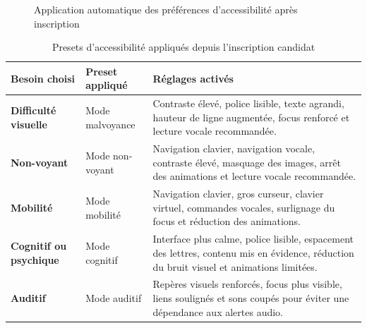 \documentclass[12pt,a4paper]{report}
\newcommand{\tblhead}[1]{\cellcolor{darkblue}\color{white}\bfseries #1}
\newcommand{\tblleft}[1]{\bfseries\color{darkblue} #1}
\begin{document}
\begin{figure}[H]
\centering
{}
\caption{Application automatique des préférences d'accessibilité après inscription}
\label{fig:accessibilite-inscription-preset}
\end{figure}

\renewcommand{\arraystretch}{1.25}
\begin{table}[H]
\centering
\begin{tabularx}{\textwidth}{|L{3.4cm}|Y|Y|}
\hline
\tblhead{Besoin choisi} & \tblhead{Preset appliqué} & \tblhead{Réglages activés} \\
\hline
\tblleft{Difficulté visuelle} & Mode malvoyance & Contraste élevé, police lisible, texte agrandi, hauteur de ligne augmentée, focus renforcé et lecture vocale recommandée. \\
\hline
\tblleft{Non-voyant} & Mode non-voyant & Navigation clavier, navigation vocale, contraste élevé, masquage des images, arrêt des animations et lecture vocale recommandée. \\
\hline
\tblleft{Mobilité} & Mode mobilité & Navigation clavier, gros curseur, clavier virtuel, commandes vocales, surlignage du focus et réduction des animations. \\
\hline
\tblleft{Cognitif ou psychique} & Mode cognitif & Interface plus calme, police lisible, espacement des lettres, contenu mis en évidence, réduction du bruit visuel et animations limitées. \\
\hline
\tblleft{Auditif} & Mode auditif & Repères visuels renforcés, focus plus visible, liens soulignés et sons coupés pour éviter une dépendance aux alertes audio. \\
\hline
\end{tabularx}
\caption{Presets d'accessibilité appliqués depuis l'inscription candidat}
\label{tab:presets-accessibilite-inscription}
\end{table}
\renewcommand{\arraystretch}{1}
\end{document}
